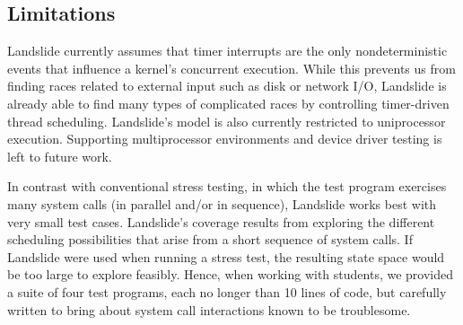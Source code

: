 \subsection{Limitations}

Landslide currently assumes that timer interrupts are the only nondeterministic events that influence a kernel's concurrent execution. While this prevents us from finding races related to external input such as disk or network I/O, Landslide is already able to find many types of complicated races by controlling timer-driven thread scheduling.
Landslide's model is also currently restricted to uniprocessor execution.
Supporting multiprocessor environments and device driver testing is left to future work.

In contrast with conventional stress testing, in which the test program exercises many system calls (in parallel and/or in sequence), Landslide works best with very small test cases.
Landslide's coverage results from exploring the different scheduling possibilities that arise from a short sequence of system calls.
If Landslide were used when running a stress test, the resulting state space would be too large to explore feasibly.
Hence, when working with students, we provided a suite of four test programs, each no longer than 10 lines of code, but carefully written to bring about system call interactions known to be troublesome.

